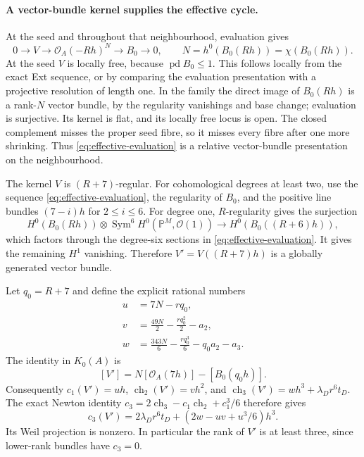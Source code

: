 \paragraph{A vector-bundle kernel supplies the effective cycle.}
At the seed and throughout that neighbourhood, evaluation gives
\begin{equation}\label{eq:effective-evaluation}
 0\longrightarrow V\longrightarrow
    \mathcal O_A(-Rh)^N\longrightarrow B_0\longrightarrow0,
 \qquad N=h^0(B_0(Rh))=\chi(B_0(Rh)).                     
\end{equation}
At the seed $V$ is locally free, because $\operatorname{pd}B_0\le1$.
This follows locally from the exact Ext sequence, or by comparing
the evaluation presentation with a projective resolution of
length one. In the family the direct image of $B_0(Rh)$ is a
rank-$N$ vector bundle, by the regularity vanishings and base
change; evaluation is surjective. Its kernel is flat, and its
locally free locus is open. The closed complement misses the
proper seed fibre, so it misses every fibre after one more
shrinking. Thus \eqref{eq:effective-evaluation} is a relative vector-bundle
presentation on the neighbourhood.

The kernel $V$ is $(R+7)$-regular. For cohomological degrees
at least two, use the sequence \eqref{eq:effective-evaluation}, the regularity of $B_0$,
and the positive line bundles $(7-i)h$ for $2\le i\le6$.
For degree one, $R$-regularity gives the surjection
\[
 H^0(B_0(Rh))\otimes\operatorname{Sym}^6H^0(\mathbb P^M,\mathcal O(1))
 \longrightarrow H^0(B_0((R+6)h)),
\]
which factors through the degree-six sections in \eqref{eq:effective-evaluation}.
It gives the remaining $H^1$ vanishing. Therefore
$V'=V((R+7)h)$ is a globally generated vector bundle.

Let $q_0=R+7$ and define the explicit rational numbers
\begin{equation}\label{eq:effective-uvw}
 \begin{split}
 u&=7N-rq_0,\\
 v&=\frac{49N}{2}-\frac{rq_0^2}{2}-a_2,\\
 w&=\frac{343N}{6}-\frac{rq_0^3}{6}-q_0a_2-a_3.
 \end{split}                                               
\end{equation}
The identity in $K_0(A)$ is
\[
 [V']=N[\mathcal O_A(7h)]-[B_0(q_0h)].
\]
Consequently $c_1(V')=uh$, $\operatorname{ch}_2(V')=vh^2$,
and $\operatorname{ch}_3(V')=wh^3+\lambda_Dr^6t_D$.
The exact Newton identity
$c_3=2\operatorname{ch}_3-c_1\operatorname{ch}_2+c_1^3/6$
therefore gives
\begin{equation}\label{eq:effective-c3}
 c_3(V')=2\lambda_Dr^6t_D+
                (2w-uv+u^3/6)h^3.                       
\end{equation}
Its Weil projection is nonzero. In particular the rank of $V'$
is at least three, since lower-rank bundles have $c_3=0$.


